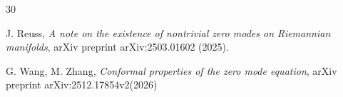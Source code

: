 \documentclass[11pt]{amsart}
\theoremstyle{plain}
\numberwithin{equation}{section}
\theoremstyle{plain}
\begin{document}
\begin{thebibliography}{30}




  J. Reuss, {\it A note on the existence of nontrivial zero modes on Riemannian manifolds}, arXiv preprint
arXiv:2503.01602 (2025).



 G. Wang, M. Zhang, {\it Conformal properties of the zero mode equation}, arXiv preprint arXiv:2512.17854v2(2026)

\end{thebibliography}
\end{document}
